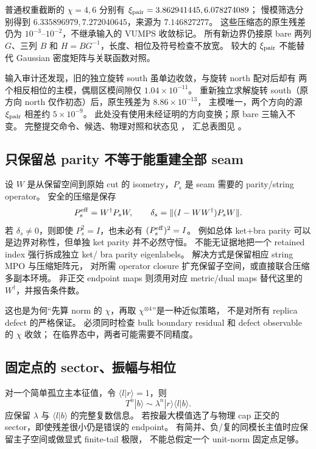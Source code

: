 \documentclass[11pt]{article}
\begin{document}
普通权重截断的 $\chi=4,6$ 分别有 $\xi_{\rm pair}=3.862941445,6.078274089$；
慢模筛选分别得到 $6.335896979,7.272040645$，来源为 $7.146827277$。
这些压缩态的原生残差仍为 $10^{-3}$--$10^{-2}$，不继承输入的 VUMPS 收敛标记。
所有新边界仍接原 bare 两列 $G$、三列 $B$ 和 $H=BG^{-1}$，长度、相位及符号检查不放宽。
较大的 $\xi_{\rm pair}$ 不能替代 Gaussian 密度矩阵与关联函数对照。

输入审计还发现，旧的独立旋转 south 虽单边收敛，与旋转 north 配对后却有
两个相反相位的主模，偶扇区模间隙仅 $1.04\times10^{-11}$。
重新独立求解旋转 south（原方向 north 仅作初态）后，原生残差为 $8.86\times10^{-13}$，
主模唯一，两个方向的源 $\xi_{\rm pair}$ 相差约 $5\times10^{-9}$。
此处没有使用未经证明的方向变换；原 bare 三输入不变。
完整提交命令、候选、物理对照和状态见
，
汇总表图见 。

\subsection{只保留总 parity 不等于能重建全部 seam}

设 $W$ 是从保留空间到原始 cut 的 isometry，$P_s$ 是 seam 需要的 parity/string operator。
安全的压缩是保存
\begin{equation}
 P_s^{\rm eff}=W^\dagger P_sW,\qquad
 \delta_s=\|(I-WW^\dagger)P_sW\|.\label{eq:string}
\end{equation}
若 $\delta_s\ne0$，则即使 $P_s^2=I$，也未必有 $(P_s^{\rm eff})^2=I$。
例如总体 ket+bra parity 可以是边界对称性，但单独 ket parity 并不必然守恒。
不能无证据地把一个 retained index 强行拆成独立 ket/ bra parity eigenlabels。
解决方式是保留相应 string MPO 与压缩矩阵元，
对所需 operator closure 扩充保留子空间，或直接联合压缩多副本环境。
非正交 endpoint maps 则须用对应 metric/dual maps 替代这里的 $W^\dagger$，并报告条件数。

这也是为何“先算 norm 的 $\chi$，再取 $\chi^{\otimes4}$”是一种近似策略，
不是对所有 replica defect 的严格保证。
必须同时检查 bulk boundary residual 和 defect observable 的 $\chi$ 收敛；
在临界态中，两者可能需要不同精度。

\subsection{固定点的 sector、振幅与相位}

对一个简单孤立主本征值，令 $\langle l|r\rangle=1$，则
\begin{equation}
 T^n|b\rangle\sim\lambda^n|r\rangle\langle l|b\rangle.
\end{equation}
应保留 $\lambda$ 与 $\langle l|b\rangle$ 的完整复数信息。
若按最大模值选了与物理 cap 正交的 sector，即使残差很小仍是错误的 endpoint。
有简并、负/复的同模长主值时应保留主子空间或做显式 finite-tail 极限，
不能总假定一个 unit-norm 固定点足够。
\end{document}
